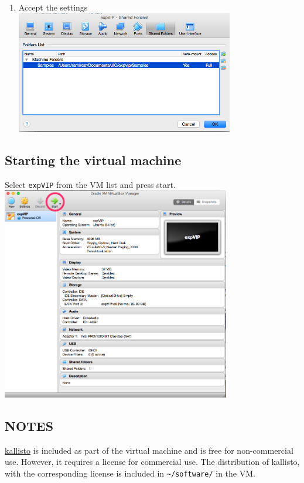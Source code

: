 \begin{enumerate}
\item
  Accept the settings \\ \includegraphics[width=0.75\textwidth]{expVIP/tutorial/images/Shared_Folder08.png}
\end{enumerate}

\subsection{Starting the virtual
machine}\label{starting-the-virtual-machine}

Select \lstinline!expVIP! from the VM list and press start.
\\ \includegraphics[width=0.75\textwidth]{expVIP/tutorial/images/StartVM01.png}

\subsection{NOTES}\label{notes}

\href{http://pachterlab.github.io/kallisto/about.html}{kallisto} is
included as part of the virtual machine and is free for non-commercial
use. However, it requires a license for commercial use. The distribution
of kallisto, with the corresponding license is included in
\lstinline!~/software/! in the VM.
